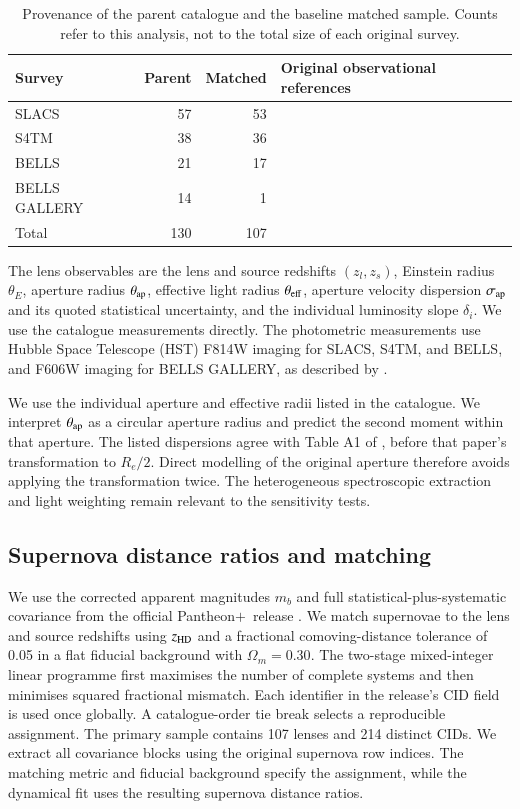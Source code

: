 \documentclass{aa}
\newcommand{\pantheon}{Pantheon$+$}
\begin{document}
\begin{table}[t]
\centering
\caption{Provenance of the parent catalogue and the baseline matched sample. Counts refer to this analysis, not to the total size of each original survey.}
\label{tab:surveys}
\begin{tabular}{lrrl}
\toprule
Survey & Parent & Matched & Original observational references \\
\midrule
SLACS & 57 & 53 & \citet{Bolton2006,Bolton2008,Auger2009,Auger2010} \\
S4TM & 38 & 36 & \citet{Shu2015,Shu2017} \\
BELLS & 21 & 17 & \citet{Brownstein2012} \\
BELLS GALLERY & 14 & 1 & \citet{Shu2016a,Shu2016b} \\
\midrule
Total & 130 & 107 & \\
\bottomrule
\end{tabular}
\end{table}

The lens observables are the lens and source redshifts $(z_l,z_s)$, Einstein radius $\theta_E$, aperture radius $\theta_{\rm ap}$, effective light radius $\theta_{\rm eff}$, aperture velocity dispersion $\sigma_{\rm ap}$ and its quoted statistical uncertainty, and the individual luminosity slope $\delta_i$. We use the catalogue measurements directly. The photometric measurements use Hubble Space Telescope (HST) F814W imaging for SLACS, S4TM, and BELLS, and F606W imaging for BELLS GALLERY, as described by \citet{stz1902}.


We use the individual aperture and effective radii listed in the catalogue. We interpret $\theta_{\rm ap}$ as a circular aperture radius and predict the second moment within that aperture. The listed dispersions agree with Table A1 of \citet{stz1902}, before that paper's transformation to $R_e/2$. Direct modelling of the original aperture therefore avoids applying the transformation twice. The heterogeneous spectroscopic extraction and light weighting remain relevant to the sensitivity tests.

\subsection{Supernova distance ratios and matching}\label{sec:pairing}
We use the corrected apparent magnitudes $m_b$ and full statistical-plus-systematic covariance from the official \pantheon\ release \citep{Brout2022,Scolnic2022}. We match supernovae to the lens and source redshifts using $z_{\rm HD}$ and a fractional comoving-distance tolerance of 0.05 in a flat fiducial background with $\Omega_m=0.30$. The two-stage mixed-integer linear programme first maximises the number of complete systems and then minimises squared fractional mismatch. Each identifier in the release's CID field is used once globally. A catalogue-order tie break selects a reproducible assignment. The primary sample contains 107 lenses and 214 distinct CIDs. We extract all covariance blocks using the original supernova row indices. The matching metric and fiducial background specify the assignment, while the dynamical fit uses the resulting supernova distance ratios.
\end{document}
